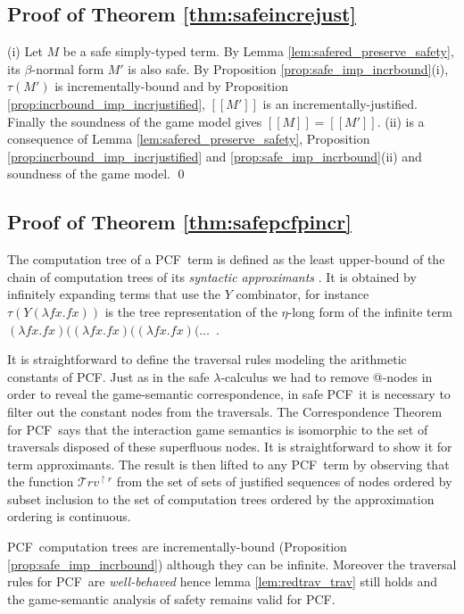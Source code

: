 \documentclass{llncs}
\newcommand\travset{\mathcal{T}rv}
\newcommand{\sem}[1]{{[\![ #1 ]\!]}}
\newcommand\pcf{\textsf{PCF}}
\begin{document}
\subsection{Proof of Theorem \ref{thm:safeincrejust}}
(i) Let $M$ be a safe simply-typed term. By Lemma
\ref{lem:safered_preserve_safety}, its $\beta$-normal form $M'$ is
also safe. By Proposition \ref{prop:safe_imp_incrbound}(i), $\tau(M')$
is incrementally-bound and by Proposition
\ref{prop:incrbound_imp_incrjustified}, $\sem{M'}$ is an
incrementally-justified. Finally the soundness of the game model gives
$\sem{M} = \sem{M'}$.  (ii) is a consequence of Lemma
\ref{lem:safered_preserve_safety}, Proposition
\ref{prop:incrbound_imp_incrjustified} and
\ref{prop:safe_imp_incrbound}(ii) and soundness of the game model.
\qed

\subsection{Proof of Theorem \ref{thm:safepcfpincr}}

The computation tree of a \pcf\ term is defined as the least
upper-bound of the chain of computation trees of its \emph{syntactic
  approximants} \cite{abramsky:game-semantics-tutorial}.  It is
obtained by infinitely expanding terms that use the $Y$ combinator,
for instance $\tau(Y (\lambda f x. f x))$ is the tree representation
of the $\eta$-long form of the infinite term $(\lambda f x. f x)
((\lambda f x. f x) ((\lambda f x. f x) ( \ldots$\ .


It is straightforward to define the traversal rules modeling the
arithmetic constants of \pcf. Just as in the safe $\lambda$-calculus
we had to remove @-nodes in order to reveal the game-semantic
correspondence, in safe \pcf\ it is necessary to filter out the
constant nodes from the traversals. The Correspondence Theorem for
\pcf\ says that the interaction game semantics is isomorphic to the
set of traversals disposed of these superfluous nodes. It is
straightforward to show it for term approximants. The result is then
lifted to any \pcf\ term by observing that the function
$\travset^{\upharpoonright r}$ from the set of sets of justified
sequences of nodes ordered by subset inclusion to the set of
computation trees ordered by the approximation ordering is continuous.

\pcf\ computation trees are incrementally-bound (Proposition \ref{prop:safe_imp_incrbound}) although they can be infinite.
Moreover the traversal rules for \pcf\ are \emph{well-behaved} hence lemma \ref{lem:redtrav_trav} still holds and the game-semantic analysis of safety remains valid for \pcf.
\end{document}
